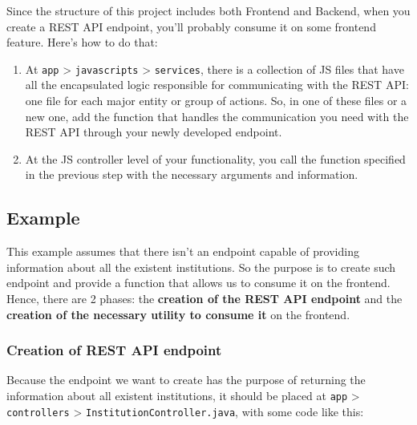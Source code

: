 \documentclass[
  11pt,
]{krantz}
\begin{document}
Since the structure of this project includes both Frontend and Backend, when you create a REST API endpoint, you'll probably consume it on some frontend feature. Here's how to do that:

\begin{enumerate}
\def\labelenumi{\arabic{enumi}.}
\item
  At \texttt{app} \textgreater{} \texttt{javascripts} \textgreater{} \texttt{services}, there is a collection of JS files that have all the encapsulated logic responsible for communicating with the REST API: one file for each major entity or group of actions. So, in one of these files or a new one, add the function that handles the communication you need with the REST API through your newly developed endpoint.
\item
  At the JS controller level of your functionality, you call the function specified in the previous step with the necessary arguments and information.
\end{enumerate}

\hypertarget{example}{%
\subsection{Example}\label{example}}

This example assumes that there isn't an endpoint capable of providing information about all the existent institutions. So the purpose is to create such endpoint and provide a function that allows us to consume it on the frontend. Hence, there are 2 phases: the \textbf{creation of the REST API endpoint} and the \textbf{creation of the necessary utility to consume it} on the frontend.

\hypertarget{creation-of-rest-api-endpoint}{%
\subsubsection{Creation of REST API endpoint}\label{creation-of-rest-api-endpoint}}

Because the endpoint we want to create has the purpose of returning the information about all existent institutions, it should be placed at \texttt{app} \textgreater{} \texttt{controllers} \textgreater{} \texttt{InstitutionController.java}, with some code like this:
\end{document}
